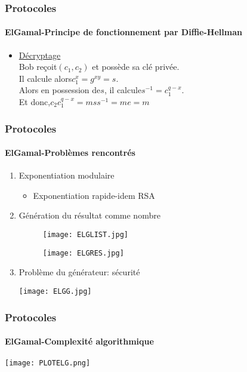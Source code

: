 \documentclass[10pt]{beamer}
\begin{document}
\begin{frame}
\frametitle{Protocoles}
\framesubtitle{ElGamal-Principe de fonctionnement par Diffie-Hellman}
\begin{itemize}
\item\underline{Décryptage}\\
Bob reçoit\hspace{0.05cm}$(c_1,c_2)$\hspace{0.05cm} et possède sa clé privée.\\
Il calcule alors\hspace{0.05cm}$c_1^{x}=g^{xy}=s$.\\
Alors en possession de\hspace{0.05cm}$s$\hspace{0.05cm}, il calcule\hspace{0.05cm}$s^{-1}=c_1^{q-x}$.\\
Et donc,\hspace{0.05cm}$c_2c_1^{q-x}=mss^{-1}=me=\boxed{m}$
\end{itemize}
\end{frame}

\begin{frame}
\frametitle{Protocoles}
\framesubtitle{ElGamal-Problèmes rencontrés}
\begin{enumerate}
\item Exponentiation modulaire
\begin{itemize}
\item Exponentiation rapide-idem RSA
\end{itemize}
\item Génération du résultat comme nombre
\begin{figure}
\begin{minipage}[t]{6cm}
\centering
\texttt{[image: ELGLIST.jpg]}
\end{minipage}
\begin{minipage}[t]{6cm}
\centering
\texttt{[image: ELGRES.jpg]}
\end{minipage}
\end{figure}
\item Problème du générateur: sécurité
\begin{center}
\texttt{[image: ELGG.jpg]}
\end{center}
\end{enumerate}
\end{frame}

\begin{frame}
\frametitle{Protocoles}
\framesubtitle{ElGamal-Complexité algorithmique}
\begin{center}
\texttt{[image: PLOTELG.png]}
\end{center}
\end{frame}
\end{document}
